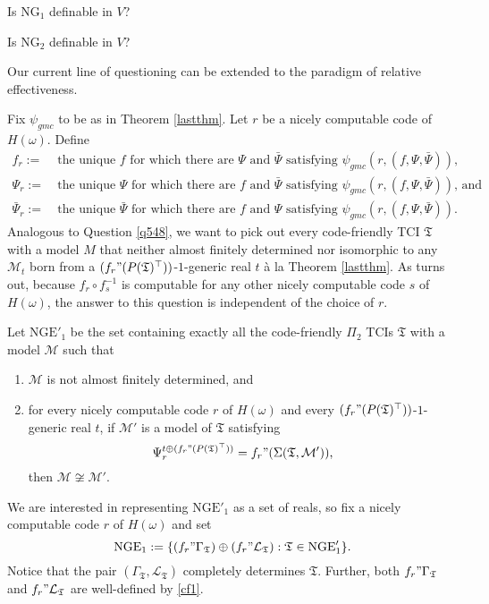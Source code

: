 \documentclass[12pt]{article}
\numberwithin{equation}{section}
\begin{document}
\begin{ques}\label{q548}
Is $\mathrm{NG}_1$ definable in $V$?
\end{ques}

\begin{ques}\label{q552}
Is $\mathrm{NG}_2$ definable in $V$?
\end{ques}

Our current line of questioning can be extended to the paradigm of relative effectiveness.

Fix $\psi_{gmc}$ to be as in Theorem \ref{lastthm}. Let $r$ be a nicely computable code of $H(\omega)$. Define
\begin{align*}
    f_r := \ & \text{the unique } f \text{ for which there are } \Psi \text{ and } \bar{\Psi} \text{ satisfying } \psi_{gmc}(r, (f, \Psi, \bar{\Psi})) \text{,} \\
    \Psi_r := \ & \text{the unique } \Psi \text{ for which there are } f \text{ and } \bar{\Psi} \text{ satisfying } \psi_{gmc}(r, (f, \Psi, \bar{\Psi})) \text{, and} \\
    \bar{\Psi}_r := \ & \text{the unique } \bar{\Psi} \text{ for which there are } f \text{ and } \Psi \text{ satisfying } \psi_{gmc}(r, (f, \Psi, \bar{\Psi})) \text{.}
\end{align*}
Analogous to Question \ref{q548}, we want to pick out every code-friendly TCI $\mathfrak{T}$ with a model $M$ that neither almost finitely determined nor isomorphic to any $\mathcal{M}_t$ born from a $(f_r" (P(\mathfrak{T})^{\top}))$-$1$-generic real $t$ \`{a} la Theorem \ref{lastthm}. As turns out, because $f_r \circ f_s^{-1}$ is computable for any other nicely computable code $s$ of $H(\omega)$, the answer to this question is independent of
the choice of $r$.

Let $\mathrm{NGE}'_1$ be the set containing exactly all the code-friendly $\Pi_2$ TCIs $\mathfrak{T}$ with a model $\mathcal{M}$ such that
\begin{enumerate}[label=(\alph*)]
    \item $\mathcal{M}$ is not almost finitely determined, and
    \item for every nicely computable code $r$ of $H(\omega)$ and every $(f_r" (P(\mathfrak{T})^{\top}))$-$1$-generic real $t$, if $\mathcal{M}'$ is a model of $\mathfrak{T}$ satisfying 
    \begin{equation*}
        \Psi_r^{t \oplus (f_r" (P(\mathfrak{T})^{\top}))} = f_r" (\Sigma(\mathfrak{T}, \mathcal{M}')) \text{,}
    \end{equation*}
    then $\mathcal{M} \not \cong \mathcal{M}'$.
\end{enumerate}
We are interested in representing $\mathrm{NGE}'_1$ as a set of reals, so fix a nicely computable code $r$ of $H(\omega)$ and set
\begin{equation*}
    \mathrm{NGE}_1 := \{(f_r" \Gamma_{\mathfrak{T}}) \oplus (f_r" \mathcal{L}_{\mathfrak{T}}) : \mathfrak{T} \in \mathrm{NGE}'_1\} \text{.}
\end{equation*}
Notice that the pair $(\Gamma_{\mathfrak{T}}, \mathcal{L}_{\mathfrak{T}})$ completely determines $\mathfrak{T}$. Further, both $f_r" \Gamma_{\mathfrak{T}}$ and $f_r" \mathcal{L}_{\mathfrak{T}}$ are well-defined by \ref{cf1}.
\end{document}
